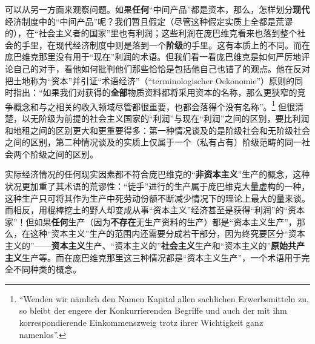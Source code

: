 \documentclass[fontset=fandol, a4paper, 12pt, openright]{ctexbook}
\begin{document}
可以从另一方面来观察问题。如果\textbf{任何}“中间产品”都是资本，那么，怎样划分\textbf{现代}经济制度中的“中间产品”呢？我们暂且假定（尽管这种假定实质上全都是荒谬的），在“社会主义者的国家”里也有利润；这些利润在庞巴维克看来也落到整个社会的手里，在现代经济制度中则是落到一个\textbf{阶级}的手里。这有本质上的不同。而在庞巴维克那里没有用于“现在”利润的术语。但我们看一看庞巴维克是如何严厉地评论自己的对手，看他如何批判他们那些恰恰是包括他自己也错了的观点。他在反对把土地称为“资本”并引证“术语经济”（“terminologischer Oekonomie”）原则的同时指出：“如果我们对获得的\textbf{全部}物质资料都将采用资本的名称，那么更狭窄的竞争概念和与之相关的收入领域尽管都很重要，也都会落得个没有名称”。\footnote{``Wenden wir n\"{a}mlich den Namen Kapital allen sachlichen Erwerbsmitteln zu, so bleibt der engere der Konkurrierenden Begriffe und auch der mit ihm korrespondierende Einkommenszweig trotz ihrer Wichtigkeit ganz namenlos''.} 但很清楚，以无阶级为前提的社会主义国家的“利润”与现在“利润”之间的区别，要比利润和地租之间的区别更大和更重要得多：第一种情况谈及的是阶级社会和无阶级社会之间的区别，第二种情况谈及的实质上仅属于一个（私有占有）阶级范畴的同一社会两个阶级之间的区别。

实际经济情况的任何现实因素都不符合庞巴维克的“\textbf{非资本主义}”生产的概念，这种状况更加重了其术语的荒谬性：“徒手”进行的生产属于庞巴维克大量虚构的一种，这种生产只可将其作为生产中死劳动份额不断减少情况下的理论上最大的量来谈。而相反，用棍棒挖土的野人却变成从事“资本主义”经济甚至是获得“利润”的“资本家”！但如果\textbf{任何}生产（因为\textbf{不存在}无生产资料的生产）都是“资本主义生产”，那么，在这种“资本主义”生产的范围内还需要分成若干部分，因为终究要区分“资本主义的”——\textbf{资本主义}生产、“资本主义的”\textbf{社会主义}生产和“资本主义的”\textbf{原始共产主义}生产等。而在庞巴维克那里这三种情况都是“资本主义生产”，一个术语用于完全不同种类的概念。
\end{document}
